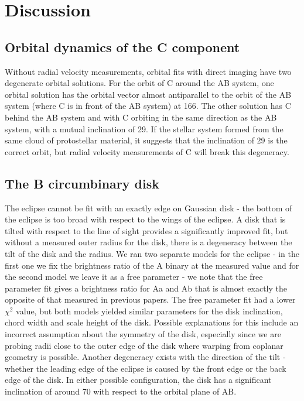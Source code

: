 \documentclass{aa}
\begin{document}
\section{Discussion}\label{sec:discuss}

\subsection{Orbital dynamics of the C component}


Without radial velocity measurements, orbital fits with direct imaging have two degenerate orbital solutions.
%
For the orbit of C around the AB system, one orbital solution has the orbital vector almost antiparallel to the orbit of the AB system (where C is in front of the AB system) at 166\degr{}.
%
The other solution has C behind the AB system and with C orbiting in the same direction as the AB system, with a mutual inclination of 29\degr{}.
%
If the stellar system formed from the same cloud of protostellar material, it suggests that the inclination of 29\degr{} is the correct orbit, but radial velocity measurements of C will break this degeneracy.

\subsection{The B circumbinary disk}

The eclipse cannot be fit with an exactly edge on Gaussian disk - the bottom of the eclipse is too broad with respect to the wings of the eclipse.
%
A disk that is tilted with respect to the line of sight provides a significantly improved fit, but without a measured outer radius for the disk, there is a degeneracy between the tilt of the disk and the radius.
%
We ran two separate models for the eclipse - in the first one we fix the brightness ratio of the A binary at the measured value and for the second model we leave it as a free parameter - we note that the free parameter fit gives a brightness ratio for Aa and Ab that is almost exactly the opposite of that measured in previous papers.
%
The free parameter fit had a lower $\chi^2$ value, but both models yielded similar parameters for the disk inclination, chord width and scale height of the disk.
%
Possible explanations for this include an incorrect assumption about the symmetry of the disk, especially since we are probing radii close to the outer edge of the disk where warping from coplanar geometry is possible.
%
Another degeneracy exists with the direction of the tilt - whether the leading edge of the eclipse is caused by the front edge or the back edge of the disk.
%
In either possible configuration, the disk has a significant inclination of around 70\degr{} with respect to the orbital plane of AB.
\end{document}
